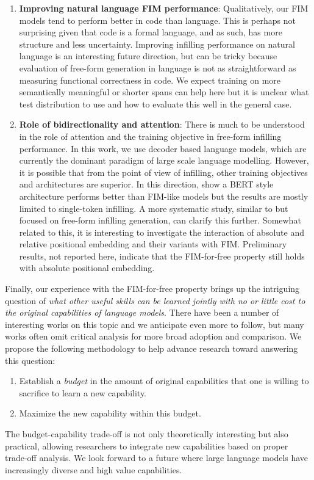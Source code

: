 \documentclass[postscript]{article}
\begin{document}
\begin{enumerate}
\item \textbf{Improving natural language FIM performance}:
Qualitatively, our FIM models tend to perform better in code than language. This is perhaps not surprising given that code is a formal language, and as such, has more structure and less uncertainty. Improving infilling performance on natural language is an interesting future direction, but can be tricky because evaluation of free-form generation in language is not as straightforward as measuring functional correctness in code. We expect training on more semantically meaningful or shorter spans can help here but it is unclear what test distribution to use and how to evaluate this well in the general case.

\item \textbf{Role of bidirectionality and attention}:
There is much to be understood in the role of attention and the training objective in free-form infilling performance. In this work, we use decoder based language models, which are currently the dominant paradigm of large scale language modelling. However, it is possible that from the point of view of infilling, other training objectives and architectures are superior. In this direction, \citep{bidirlm} show a BERT style architecture performs better than FIM-like models but the results are mostly limited to single-token infilling. A more systematic study, similar to \citep{huggingface, unifying} but focused on free-form infilling generation, can clarify this further.
Somewhat related to this, it is interesting to investigate the interaction of absolute and relative positional embedding and their variants with FIM. Preliminary results, not reported here, indicate that the FIM-for-free property still holds with absolute positional embedding. 

\end{enumerate}

Finally, our experience with the FIM-for-free property brings up the intriguing question of \emph{what other useful skills can be learned jointly with no or little cost to the original capabilities of language models}. There have been a number of interesting works on this topic and we anticipate even more to follow, but many works often omit critical analysis for more broad adoption and comparison. We propose the following methodology to help advance research toward answering this question:
\begin{enumerate}
\item Establish a \emph{budget} in the amount of original capabilities that one is willing to sacrifice to learn a new capability.
\item Maximize the new capability within this budget.
\end{enumerate}
The budget-capability trade-off is not only theoretically interesting but also practical, allowing researchers to integrate new capabilities based on proper trade-off analysis. We look forward to a future where large language models have increasingly diverse and high value capabilities.
\end{document}
